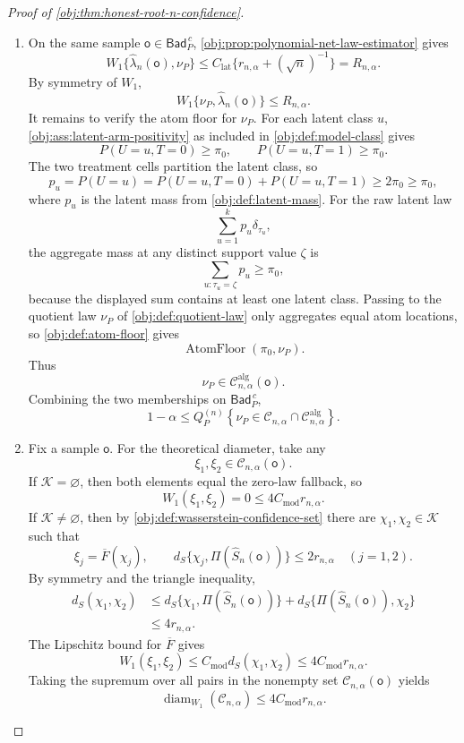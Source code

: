 \begin{proof}[Proof of \cref{obj:thm:honest-root-n-confidence}]
\begin{enumerate}
\item On the same sample \(\mathsf o\in\mathsf{Bad}_P^{\,c}\), \cref{obj:prop:polynomial-net-law-estimator} gives
\[
W_1\{\widehat\lambda_n(\mathsf o),\nu_P\}
\le
C_{\mathrm{lat}}\{r_{n,\alpha}+(\sqrt n)^{-1}\}
=
R_{n,\alpha}.
\]
By symmetry of \(W_1\),
\[
W_1\{\nu_P,\widehat\lambda_n(\mathsf o)\}
\le R_{n,\alpha}.
\]
It remains to verify the atom floor for \(\nu_P\).  For each latent class \(u\), \cref{obj:ass:latent-arm-positivity} as included in \cref{obj:def:model-class} gives
\[
P(U=u,T=0)\ge\pi_0,
\qquad
P(U=u,T=1)\ge\pi_0.
\]
The two treatment cells partition the latent class, so
\[
p_u=P(U=u)=P(U=u,T=0)+P(U=u,T=1)\ge2\pi_0\ge\pi_0,
\]
where \(p_u\) is the latent mass from \cref{obj:def:latent-mass}.  For the raw latent law
\[
\sum_{u=1}^{k}p_u\delta_{\tau_u},
\]
the aggregate mass at any distinct support value \(\zeta\) is
\[
\sum_{u:\tau_u=\zeta}p_u\ge\pi_0,
\]
because the displayed sum contains at least one latent class.  Passing to the quotient law \(\nu_P\) of \cref{obj:def:quotient-law} only aggregates equal atom locations, so \cref{obj:def:atom-floor} gives
\[
\operatorname{AtomFloor}(\pi_0,\nu_P).
\]
Thus
\[
\nu_P\in\mathcal C^{\mathrm{alg}}_{n,\alpha}(\mathsf o).
\]
Combining the two memberships on \(\mathsf{Bad}_P^{\,c}\),
\[
1-\alpha
\le
Q_P^{(n)}
\left\{
\nu_P\in
\mathcal C_{n,\alpha}\cap\mathcal C^{\mathrm{alg}}_{n,\alpha}
\right\}.
\]

\item Fix a sample \(\mathsf o\).  For the theoretical diameter, take any
\[
\xi_1,\xi_2\in\mathcal C_{n,\alpha}(\mathsf o).
\]
If \(\mathcal K=\varnothing\), then both elements equal the zero-law fallback, so
\[
W_1(\xi_1,\xi_2)=0\le4C_{\mathrm{mod}}r_{n,\alpha}.
\]
If \(\mathcal K\ne\varnothing\), then by \cref{obj:def:wasserstein-confidence-set} there are \(\chi_1,\chi_2\in\mathcal K\) such that
\[
\xi_j=\overline F(\chi_j),
\qquad
d_S\{\chi_j,\Pi(\widehat S_n(\mathsf o))\}\le2r_{n,\alpha}
\quad(j=1,2).
\]
By symmetry and the triangle inequality,
\[
\begin{aligned}
d_S(\chi_1,\chi_2)
&\le
d_S\{\chi_1,\Pi(\widehat S_n(\mathsf o))\}
+
d_S\{\Pi(\widehat S_n(\mathsf o)),\chi_2\}  \\
&\le4r_{n,\alpha}.
\end{aligned}
\]
The Lipschitz bound for \(\overline F\) gives
\[
W_1(\xi_1,\xi_2)
\le
C_{\mathrm{mod}}d_S(\chi_1,\chi_2)
\le
4C_{\mathrm{mod}}r_{n,\alpha}.
\]
Taking the supremum over all pairs in the nonempty set \(\mathcal C_{n,\alpha}(\mathsf o)\) yields
\[
\operatorname{diam}_{W_1}(\mathcal C_{n,\alpha})
\le
4C_{\mathrm{mod}}r_{n,\alpha}.
\]


\end{enumerate}
\end{proof}
